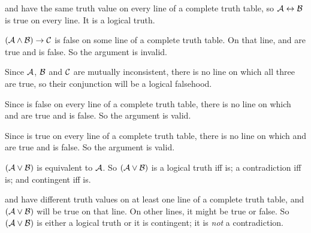 \documentclass[PHIL101-Textbook.tex]{subfiles}
\begin{document}
\vfill
\pagebreak
{}
\begin{earg}
\item %
 and  have the same truth value on every line of a complete truth table, so $\mathcal{A}\leftrightarrow\mathcal{B}$ is true on every line. It is a logical truth.
\item %
 $(\mathcal{A}\land\mathcal{B})\rightarrow\mathcal{C}$ is false on some line of a complete truth table. On that line,  and  are true and  is false. So the argument is invalid.
\item %
Since $\mathcal{A}$, $\mathcal{B}$ and $\mathcal{C}$  are mutually inconsistent,  there is no line on which all three are true, so their conjunction will be a logical falsehood.
\item %
Since  is false on every line of a complete truth table, there is no line on which  and  are true and  is false. So the argument is valid.
\item %
Since  is true on every line of a complete truth table, there is no line on which  and  are true and  is false. So the argument is valid.
\item %
$(\mathcal{A}\vee\mathcal{B})$ is equivalent to $\mathcal{A}$. So $(\mathcal{A}\vee\mathcal{B})$ is a logical truth iff  is; a contradiction iff  is; and contingent iff  is.
\item %
 and  have different truth values on at least one line of a complete truth table, and $(\mathcal{A}\vee\mathcal{B})$ will be true on that line. On other lines, it might be true or false. So $(\mathcal{A}\vee\mathcal{B})$ is either a logical truth or it is contingent; it is \emph{not} a contradiction.
\end{earg}
\end{document}
